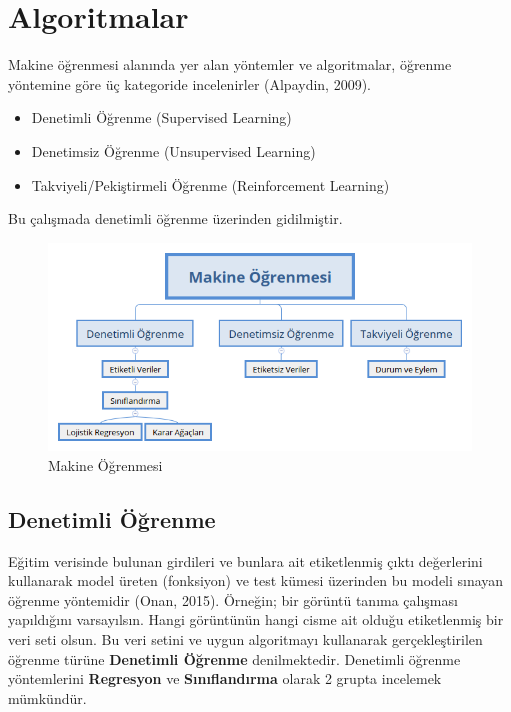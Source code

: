 \documentclass[12pt,twoside]{deuthesis}
\providecommand{\tightlist}{%
  \setlength{\itemsep}{0pt}\setlength{\parskip}{0pt}}
\begin{document}
\hypertarget{algoritmalar}{%
\chapter{Algoritmalar}\label{algoritmalar}}

Makine öğrenmesi alanında yer alan yöntemler ve algoritmalar, öğrenme yöntemine göre üç kategoride incelenirler (Alpaydin, 2009).
\begin{itemize}
\tightlist
\item
  Denetimli Öğrenme (Supervised Learning)
\item
  Denetimsiz Öğrenme (Unsupervised Learning)
\item
  Takviyeli/Pekiştirmeli Öğrenme (Reinforcement Learning)
\end{itemize}
Bu çalışmada denetimli öğrenme üzerinden gidilmiştir.
\begin{figure}

{\centering \includegraphics[width=1\linewidth]{figure/makine-ogrenmesi} 

}

\caption{Makine Öğrenmesi}\label{fig:unnamed-chunk-1}
\end{figure}
\hypertarget{denetimli-uxf6ux11frenme}{%
\section{Denetimli Öğrenme}\label{denetimli-uxf6ux11frenme}}

Eğitim verisinde bulunan girdileri ve bunlara ait etiketlenmiş çıktı değerlerini kullanarak model üreten (fonksiyon) ve test kümesi üzerinden bu modeli sınayan öğrenme yöntemidir (Onan, 2015). Örneğin; bir görüntü tanıma çalışması yapıldığını varsayılsın. Hangi görüntünün hangi cisme ait olduğu etiketlenmiş bir veri seti olsun. Bu veri setini ve uygun algoritmayı kullanarak gerçekleştirilen öğrenme türüne \textbf{Denetimli Öğrenme} denilmektedir. Denetimli öğrenme yöntemlerini \textbf{Regresyon} ve \textbf{Sınıflandırma} olarak 2 grupta incelemek mümkündür.
\end{document}
